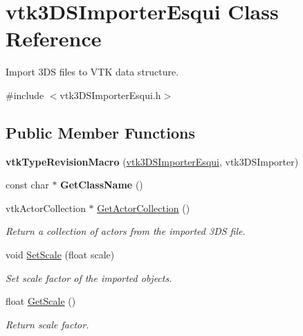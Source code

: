 \hypertarget{classvtk3DSImporterEsqui}{
\section{vtk3DSImporterEsqui Class Reference}
\label{classvtk3DSImporterEsqui}
}


Import 3DS files to VTK data structure.  




{\ttfamily \#include $<$vtk3DSImporterEsqui.h$>$}

\subsection*{Public Member Functions}
\begin{DoxyCompactItemize}
\item 
\hypertarget{classvtk3DSImporterEsqui_a657b2bd3c6be6b0fb009801360017e1b}{
{\bfseries vtkTypeRevisionMacro} (\hyperlink{classvtk3DSImporterEsqui}{vtk3DSImporterEsqui}, vtk3DSImporter)}
\label{classvtk3DSImporterEsqui_a657b2bd3c6be6b0fb009801360017e1b}

\item 
\hypertarget{classvtk3DSImporterEsqui_a7eb8f26fda7f029ad225c15f7775447c}{
const char $\ast$ {\bfseries GetClassName} ()}
\label{classvtk3DSImporterEsqui_a7eb8f26fda7f029ad225c15f7775447c}

\item 
\hypertarget{classvtk3DSImporterEsqui_aea8b6e9f5ca12c2df69bdf51106e0caf}{
vtkActorCollection $\ast$ \hyperlink{classvtk3DSImporterEsqui_aea8b6e9f5ca12c2df69bdf51106e0caf}{GetActorCollection} ()}
\label{classvtk3DSImporterEsqui_aea8b6e9f5ca12c2df69bdf51106e0caf}

\begin{DoxyCompactList}\small\item\em Return a collection of actors from the imported 3DS file. \item\end{DoxyCompactList}\item 
void \hyperlink{classvtk3DSImporterEsqui_a79eed232c14247f4a9916c98ac5f5acc}{SetScale} (float scale)
\begin{DoxyCompactList}\small\item\em Set scale factor of the imported objects. \item\end{DoxyCompactList}\item 
float \hyperlink{classvtk3DSImporterEsqui_a3951ad4b8163e28825f7f9afdfcfa46c}{GetScale} ()
\begin{DoxyCompactList}\small\item\em Return scale factor. \item\end{DoxyCompactList}\end{DoxyCompactItemize}
